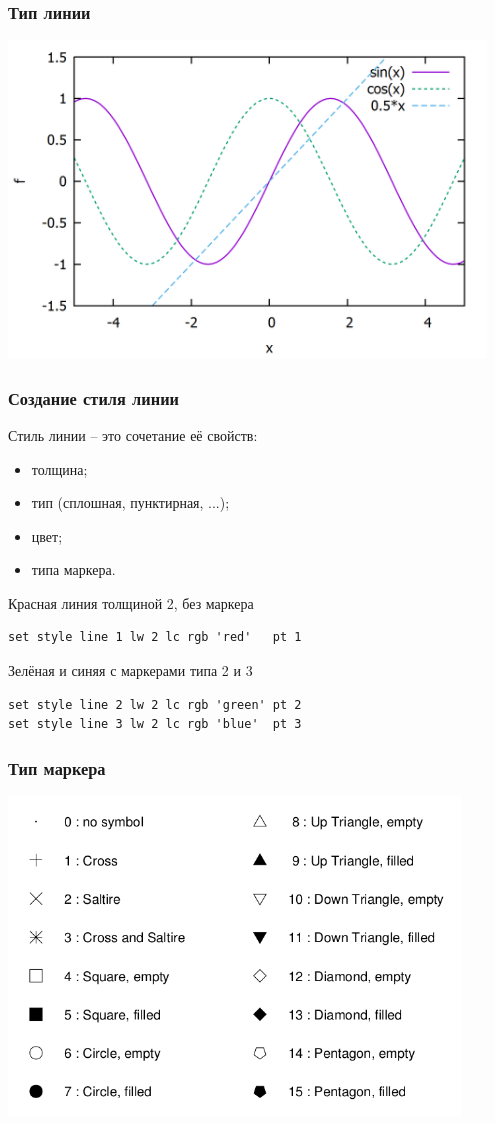 \documentclass[12pt, compress]{beamer}
\begin{document}
\begin{frame}[c,fragile]
\frametitle{Тип линии}
\includegraphics[width=0.95\textwidth]{./gp/line_style_line.png}
\end{frame}

\begin{frame}[c,fragile]
\frametitle{Создание стиля линии}
Стиль линии -- это сочетание её свойств:
\begin{itemize}
  \item толщина;
  \item тип (сплошная, пунктирная, ...);
  \item цвет;
  \item типа маркера.
\end{itemize}
Красная линия толщиной 2, без маркера
\begin{lstlisting}
set style line 1 lw 2 lc rgb 'red'   pt 1
\end{lstlisting}
Зелёная и синяя с маркерами типа 2 и 3
\begin{lstlisting}
set style line 2 lw 2 lc rgb 'green' pt 2
set style line 3 lw 2 lc rgb 'blue'  pt 3
\end{lstlisting}
\end{frame}

\begin{frame}[t,fragile]
\frametitle{Тип маркера}
\includegraphics[width=0.9\textwidth]{marker_types.png}
\end{frame}
\end{document}
